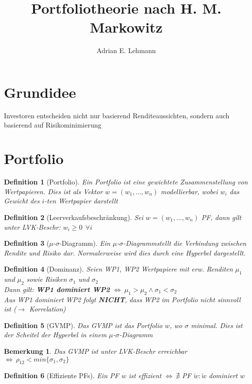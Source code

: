 \documentclass[a4paper]{article}
\title{Portfoliotheorie nach H. M. Markowitz}
\author{Adrian E. Lehmann}
\theoremstyle{break}
\newcommand{\msd}{$\mu$-$\sigma$-Diagramm}
\newtheorem{defi}{Definition}[section]
\newtheorem{ann}{Bemerkung}[section]
\begin{document}
        \maketitle
        \tableofcontents
        \newpage


\section{Grundidee}
    Investoren entscheiden nicht nur basierend  Renditeaussichten, sondern auch basierend auf Risikominimierung
\section{Portfolio}
    \begin{defi}[Portfolio]
        Ein Portfolio ist eine gewichtete Zusammenstellung von Wertpapieren. Dies ist als Vektor $w = (w_1, \dots, w_n)$ modellierbar, wobei $w_i$ das Gewicht des $i$-ten Wertpapier darstellt
    \end{defi}
    \begin{defi}[Leerverkaufsbeschränkung]
        Sei $w = (w_1, \dots, w_n)$ PF, dann gilt unter LVK-Beschr: $w_i \geq 0 ~ ~ \forall i$
    \end{defi}
    \begin{defi}[\msd]
        Ein \msd stellt die Verbindung zwischen Rendite und Risiko dar. Normalerweise wird dies durch eine Hyperbel dargestellt.
    \end{defi}
    \begin{defi}[Dominanz]
        Seien WP1, WP2 Wertpapiere mit erw. Renditen $\mu_1$ und $\mu_2$ sowie Risiken $\sigma_1$ und $\sigma_2$\\
    Dann gilt: \textbf{WP1 dominiert WP2} $\Longleftrightarrow ~ \mu_1 > \mu_2 \wedge \sigma_1 < \sigma_2$\\
        \emph{Aus WP1 dominiert WP2 folgt \textbf{NICHT}, dass WP2 im Portfolio nicht sinnvoll ist ($\rightarrow$ Korrelation)}
    \end{defi}
    \begin{defi}[GVMP]
        Das GVMP ist das Portfolio $w$, wo $\sigma$ minimal. Dies ist der Scheitel der Hyperbel in einem \msd 
    \end{defi}
    \begin{ann}
        Das GVMP ist unter LVK-Beschr erreichbar $\Longleftrightarrow ~ \rho_{12} < min \{\sigma_1, \sigma_2\}$
    \end{ann}
    \begin{defi}[Effiziente PFs]
        Ein PF $w$ ist effizient $\Longleftrightarrow ~ \nexists$ PF $\tilde{w}: \tilde{w}$ dominiert $w$
    \end{defi}
\end{document}
